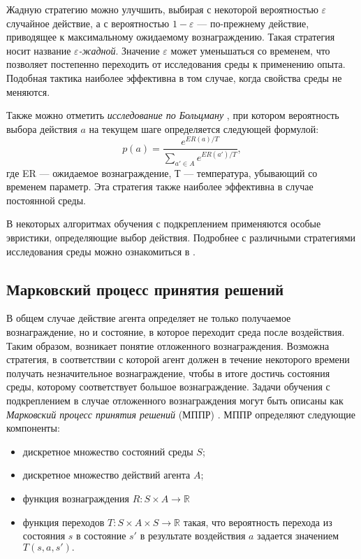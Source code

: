 		 Жадную стратегию можно улучшить, выбирая с некоторой вероятностью $\varepsilon$ случайное действие, а с вероятностью $1 - \varepsilon$ --- по-прежнему действие, приводящее к максимальному ожидаемому вознаграждению. Такая стратегия носит название \emph{$\varepsilon$-жадной}. Значение $\varepsilon$ может уменьшаться со временем, что позволяет постепенно переходить от исследования среды к применению опыта. Подобная тактика наиболее эффективна в том случае, когда свойства среды не меняются.
		 
		 Также можно отметить \emph{исследование по Больцману} \cite{systems}, при котором вероятность выбора действия $a$ на текущем шаге определяется следующей формулой:
		 $$p(a) = \frac{e^{ER(a)/T}}{\sum_{a' \in A}{e^{ER(a')/T}}},$$
		где ER --- ожидаемое вознаграждение, Т --- температура, убывающий со временем параметр. Эта стратегия также наиболее эффективна в случае постоянной среды.
		 
		 В некоторых алгоритмах обучения с подкреплением применяются особые эвристики, определяющие выбор действия. Подробнее с различными стратегиями исследования среды можно ознакомиться в \cite{survey}.
		 
		\subsection{Марковский процесс принятия решений} 
		В общем случае действие агента определяет не только получаемое вознаграждение, но и состояние, в которое переходит среда после воздействия. Таким образом, возникает понятие отложенного вознаграждения. Возможна стратегия, в соответствии с которой агент должен в течение некоторого времени получать незначительное вознаграждение, чтобы в итоге достичь состояния среды, которому соответствует большое вознаграждение. Задачи обучения с подкреплением в случае отложенного вознаграждения могут быть описаны как \emph{Марковский процесс принятия решений} (МППР) \cite{systems, sutton}. МППР определяют следующие компоненты:
		\begin{itemize}
		  \item дискретное множество состояний среды $S$;
		  \item дискретное множество действий агента $A$;
		  \item функция вознаграждения $R : S\times A \rightarrow \mathbb{R}$
		  \item функция переходов $T : S\times A\times S\rightarrow \mathbb{R}$ 
				такая, что вероятность перехода из состояния $s$ в состояние $s'$ в результате воздействия $a$ задается значением $T(s, a, s').$
		\end{itemize}
		

